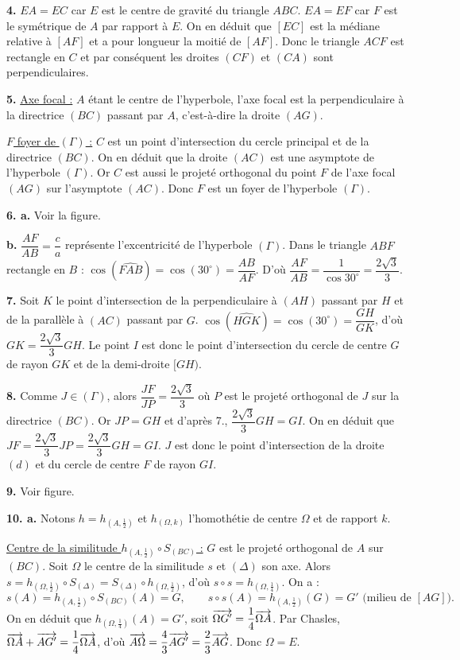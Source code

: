 \documentclass[11pt]{article}
\begin{document}
\textbf{4.} $EA = EC$ car $E$ est le centre de gravité du triangle $ABC$. $EA = EF$ car $F$ est le symétrique de $A$ par rapport à $E$. On en déduit que $[EC]$ est la médiane relative à $[AF]$ et a pour longueur la moitié de $[AF]$. Donc le triangle $ACF$ est rectangle en $C$ et par conséquent les droites $(CF)$ et $(CA)$ sont perpendiculaires.

\textbf{5.} \underline{Axe focal :} $A$ étant le centre de l'hyperbole, l'axe focal est la perpendiculaire à la directrice $(BC)$ passant par $A$, c'est-à-dire la droite $(AG)$.

\underline{$F$ foyer de $(\Gamma)$ :} $C$ est un point d'intersection du cercle principal et de la directrice $(BC)$. On en déduit que la droite $(AC)$ est une asymptote de l'hyperbole $(\Gamma)$. Or $C$ est aussi le projeté orthogonal du point $F$ de l'axe focal $(AG)$ sur l'asymptote $(AC)$. Donc $F$ est un foyer de l'hyperbole $(\Gamma)$.

\textbf{6. a.} Voir la figure.

\textbf{b.} $\dfrac{AF}{AB} = \dfrac{c}{a}$ représente l'excentricité de l'hyperbole $(\Gamma)$. Dans le triangle $ABF$ rectangle en $B$ : $\cos(\widehat{FAB}) = \cos(30^\circ) = \dfrac{AB}{AF}$. D'où $\dfrac{AF}{AB} = \dfrac{1}{\cos 30^\circ} = \dfrac{2\sqrt{3}}{3}$.

\textbf{7.} Soit $K$ le point d'intersection de la perpendiculaire à $(AH)$ passant par $H$ et de la parallèle à $(AC)$ passant par $G$. $\cos(\widehat{HGK}) = \cos(30^\circ) = \dfrac{GH}{GK}$, d'où $GK = \dfrac{2\sqrt{3}}{3}GH$. Le point $I$ est donc le point d'intersection du cercle de centre $G$ de rayon $GK$ et de la demi-droite $[GH)$.

\textbf{8.} Comme $J \in (\Gamma)$, alors $\dfrac{JF}{JP} = \dfrac{2\sqrt{3}}{3}$ où $P$ est le projeté orthogonal de $J$ sur la directrice $(BC)$. Or $JP = GH$ et d'après 7., $\dfrac{2\sqrt{3}}{3}GH = GI$. On en déduit que $JF = \dfrac{2\sqrt{3}}{3}JP = \dfrac{2\sqrt{3}}{3}GH = GI$. $J$ est donc le point d'intersection de la droite $(d)$ et du cercle de centre $F$ de rayon $GI$.

\textbf{9.} Voir figure.

\textbf{10. a.} Notons $h = h_{(A,\frac{1}{2})}$ et $h_{(\Omega,k)}$ l'homothétie de centre $\Omega$ et de rapport $k$.

\underline{Centre de la similitude $h_{(A,\frac{1}{2})} \circ S_{(BC)}$ :} $G$ est le projeté orthogonal de $A$ sur $(BC)$. Soit $\Omega$ le centre de la similitude $s$ et $(\Delta)$ son axe. Alors $s = h_{(\Omega,\frac{1}{2})} \circ S_{(\Delta)} = S_{(\Delta)} \circ h_{(\Omega,\frac{1}{2})}$, d'où $s \circ s = h_{(\Omega,\frac{1}{4})}$. On a :
\[ s(A) = h_{(A,\frac{1}{2})} \circ S_{(BC)}(A) = G, \qquad s \circ s(A) = h_{(A,\frac{1}{2})}(G) = G' \text{ (milieu de }[AG]). \]
On en déduit que $h_{(\Omega,\frac{1}{4})}(A) = G'$, soit $\overrightarrow{\Omega G'} = \dfrac{1}{4}\overrightarrow{\Omega A}$. Par Chasles, $\overrightarrow{\Omega A} + \overrightarrow{AG'} = \dfrac{1}{4}\overrightarrow{\Omega A}$, d'où $\overrightarrow{A\Omega} = \dfrac{4}{3}\overrightarrow{AG'} = \dfrac{2}{3}\overrightarrow{AG}$. Donc $\Omega = E$.
\end{document}
